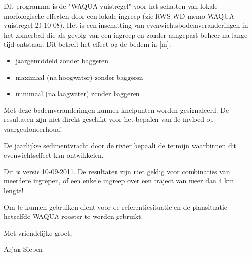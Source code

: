 Dit programma is de "WAQUA vuistregel" voor het schatten van lokale morfologische effecten door een lokale ingreep (zie RWS-WD memo WAQUA vuistregel 20-10-08).
Het is een inschatting van evenwichtsbodemveranderingen in het zomerbed die als gevolg van een ingreep en zonder aangepast beheer na lange tijd ontstaan.
Dit betreft het effect op de bodem in [m]:

\begin{itemize}
\item jaargemiddeld zonder baggeren
\item maximaal (na hoogwater) zonder baggeren
\item minimaal (na laagwater) zonder baggeren
\end{itemize}

Met deze bodemveranderingen kunnen knelpunten worden gesignaleerd.
De resultaten zijn niet direkt geschikt voor het bepalen van de invloed op vaargeulonderhoud!

De jaarlijkse sedimentvracht door de rivier bepaalt de termijn waarbinnen dit evenwichtseffect kan ontwikkelen.

Dit is versie 10-09-2011.
De resultaten zijn niet geldig voor combinaties van meerdere ingrepen, of een enkele ingreep over een traject van meer dan 4 km lengte!

Om \dfastmi te kunnen gebruiken dient voor de referentiesituatie en de plansituatie hetzelfde WAQUA rooster te worden gebruikt.

Met vriendelijke groet,

Arjan Sieben